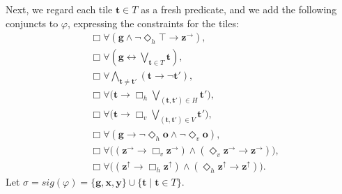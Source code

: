\documentclass[10pt,a4paper]{amsart}
\theoremstyle{plain}
\theoremstyle{definition}
\newcommand{\sig}{\mathit{sig}}
\newcommand{\bbvarup}{\Zvar^\uparrow}
\newcommand{\bbvarright}{\Zvar^\to}
\newcommand{\Dht}[1]{\Diamond_h{#1}}
\newcommand{\Dvt}[1]{\Diamond_v{#1}}
\newcommand{\Bht}[1]{\Box_h{#1}}
\newcommand{\Bvt}[1]{\Box_v{#1}}
\newcommand{\fform}[1]{\boldsymbol{#1}}
\newcommand{\gvar}{\fform{g}}
\newcommand{\tvar}{\fform{t}}
\newcommand{\xvar}{\fform{x}}
\newcommand{\yvar}{\fform{y}}
\newcommand{\ovar}{\fform{o}}
\newcommand{\Zvar}{\fform{z}}
\newcommand{\Bv}{\forall}
\newcommand{\Bh}{\Box}
\begin{document}
%
Next, we regard each tile $\tvar\in T$ as a fresh predicate, and we add the following conjuncts to $\varphi$, expressing the constraints for the tiles: 
%
\begin{align}
	\label{vedge}
	& \Bh\Bv (\gvar \wedge \neg \Dht{\top} \rightarrow \bbvarright),\\
	\label{tile1}	
	& \Bh\Bv (\gvar \leftrightarrow \bigvee_{\tvar\in T}\tvar),\\
%
\label{tile2}		
	&  \Bh\Bv \bigwedge_{\tvar\not=\tvar'}(\tvar\rightarrow \neg \tvar'),\\
       \label{tile3}	
	& \Bh\Bv \bigl(\tvar \rightarrow \Bht{\bigvee_{(\tvar,\tvar')\in H} \tvar'}\bigr),\\
	\label{tile4}	
	& \Bh\Bv \bigl(\tvar \rightarrow \Bvt{\bigvee_{(\tvar,\tvar')\in V} \tvar'}\bigr),\\	
	\label{ounique}
	& \Bh\Bv(\gvar\to\neg\Dht\ovar\land\neg\Dvt\ovar),\\
	\label{tilelast1}
	& \Bh\Bv \bigl((\bbvarright \rightarrow \Bvt{\bbvarright})
	\wedge (\Dvt{\bbvarright} \rightarrow \bbvarright)\bigr),\\
	\label{tilelast2}	
	& \Bh\Bv \bigl((\bbvarup \rightarrow \Bht{\bbvarup})
	\wedge (\Dht{\bbvarup}\rightarrow \bbvarup)\bigr).
\end{align}
%
%
Let $\sigma=\sig(\varphi)=\{\gvar,\xvar,\yvar\}\cup\{\tvar\mid\tvar\in T\}$.
\end{document}
